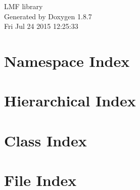 \documentclass[twoside]{book}
\newcommand{\+}{\discretionary{\mbox{\scriptsize$\hookleftarrow$}}{}{}}
\newcommand{\clearemptydoublepage}{%
  \newpage{\pagestyle{empty}\cleardoublepage}%
}
\begin{document}
\hypersetup{pageanchor=false,
             bookmarks=true,
             bookmarksnumbered=true,
             pdfencoding=unicode
            }
\begin{titlepage}
\vspace*{7cm}
\begin{center}%
{\Large L\+M\+F library }\\
\vspace*{1cm}
{\large Generated by Doxygen 1.8.7}\\
\vspace*{0.5cm}
{\small Fri Jul 24 2015 12:25:33}\\
\end{center}
\end{titlepage}
\clearemptydoublepage
\tableofcontents
\clearemptydoublepage
{}
\hypersetup{pageanchor=true}

\chapter{Namespace Index}

\chapter{Hierarchical Index}

\chapter{Class Index}

\chapter{File Index}

\end{document}
